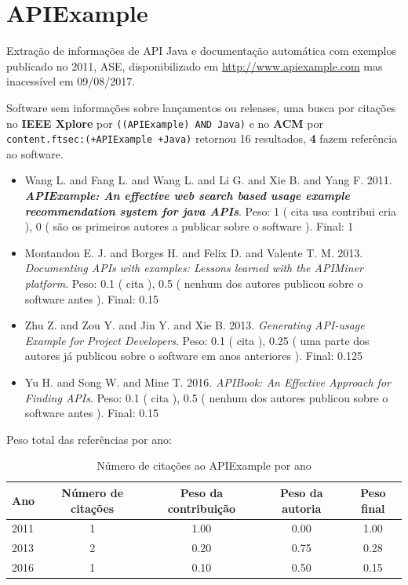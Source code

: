 \section{APIExample}

Extração de informações de API Java e documentação automática com exemplos
publicado no 2011, ASE,
disponibilizado em \url{http://www.apiexample.com}
mas inacessível em 09/08/2017.

Software sem informações sobre lançamentos ou releases,
uma busca por citações no {\bf IEEE Xplore} por
\texttt{((APIExample) AND Java)}
e no {\bf ACM} por
\texttt{content.ftsec:(+APIExample +Java)}
retornou
16 resultados,
{\bf 4} fazem referência ao software.

\begin{itemize}
\item Wang L. and Fang L. and Wang L. and Li G. and Xie B. and Yang F.
      2011.
        \textbf{\textit{ APIExample: An effective web search based usage example recommendation system for java APIs}}.
      Peso:
      1 (
          cita
          usa
          contribui
          cria
      ),
      0 (
são os primeiros autores a publicar sobre o software
      ).
      Final:
      1

\item Montandon E. J. and Borges H. and Felix D. and Valente T. M.
      2013.
        \textit{ Documenting APIs with examples: Lessons learned with the APIMiner platform}.
      Peso:
      0.1 (
          cita
      ),
      0.5 (
nenhum dos autores publicou sobre o software antes
      ).
      Final:
      0.15

\item Zhu Z. and Zou Y. and Jin Y. and Xie B.
      2013.
        \textit{ Generating API-usage Example for Project Developers}.
      Peso:
      0.1 (
          cita
      ),
      0.25 (
uma parte dos autores já publicou sobre o software em anos anteriores
      ).
      Final:
      0.125

\item Yu H. and Song W. and Mine T.
      2016.
        \textit{ APIBook: An Effective Approach for Finding APIs}.
      Peso:
      0.1 (
          cita
      ),
      0.5 (
nenhum dos autores publicou sobre o software antes
      ).
      Final:
      0.15

\end{itemize}

Peso total das referências por ano:

\begin{table}[h]
\caption{Número de citações ao APIExample por ano}
\centering
\begin{tabular}{| l | c | c | c | c |}
  \hline
  Ano & Número de citações & Peso da contribuição & Peso da autoria & Peso final \\
  \hline
  2011
    & 1
    & 1.00
    & 0.00
    & 1.00 \\
  2013
    & 2
    & 0.20
    & 0.75
    & 0.28 \\
  2016
    & 1
    & 0.10
    & 0.50
    & 0.15 \\
  \hline
\end{tabular}
\end{table}


